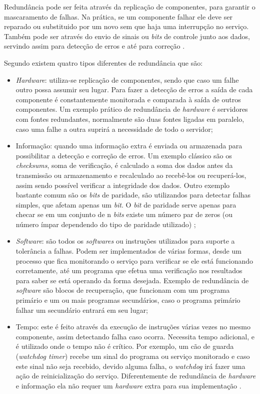 Redundância pode ser feita através da replicação de componentes, para garantir o mascaramento de falhas.
Na prática, se um componente falhar ele deve ser reparado ou substituido por um novo sem que haja uma interrupção no serviço.
Também pode ser através do envio de sinais ou \textit{bits} de controle junto aos dados, 
servindo assim para detecção de erros e até para correção \cite{weber2002}.

Segundo \cite{norvag2000} existem quatro tipos diferentes de redundância que são:
\begin{itemize}
 \item \textit{Hardware}: utiliza-se replicação de componentes, sendo que caso um falhe outro possa assumir seu lugar. 
 Para fazer a detecção de erros a saída de cada componente é constantemente monitorada e comparada à saída de outros componentes.
 Um exemplo prático de redundância de \textit{hardware} é servidores com fontes redundantes, normalmente são duas fontes ligadas em paralelo, 
 caso uma falhe a outra suprirá a necessidade de todo o servidor;
 \item Informação: quando uma informação extra é enviada ou armazenada para possibilitar a detecção e correção de erros.
 Um exemplo clássico são os \textit{checksums}, soma de verificação, é calculado a soma dos dados antes da transmissão ou armazenamento 
 e recalculado ao recebê-los ou recuperá-los, assim sendo possível verificar a integridade dos dados. Outro exemplo bastante comum são os 
 \textit{bits} de paridade, são utilizandos para detectar falhas simples, que afetam apenas um \textit{bit}. O \textit{bit} de paridade 
 serve apenas para checar se em um conjunto de n \textit{bits} existe um número par de zeros (ou número ímpar dependendo do tipo de paridade 
 utilizado) \cite{weber2002};
 \item \textit{Software}: são todos os \textit{softwares} ou instruções utilizados para suporte a tolerância a falhas. Podem ser implementados
 de várias formas, desde um processo que fica monitorando o serviço para verificar se ele está funcionando corretamente, até um programa
 que efetua uma verificação nos resultados para saber se está operando da forma desejada. Exemplo de redundância de \textit{software} são 
 blocos de recuperação, que funcionam com um programa primário e um ou mais programas secundários, caso o programa primário falhar um secundário
 entrará em seu lugar;
 \item Tempo: este é feito através da execução de instruções várias vezes no mesmo componente, assim detectando falha caso ocorra.
 Necessita tempo adicional, e é utilizado onde o tempo não é crítico. Por exemplo, um cão de guarda (\textit{watchdog timer})
 recebe um sinal do programa ou serviço monitorado e caso este sinal não seja recebido, devido alguma falha, o \textit{watchdog} irá fazer 
 uma ação de reinicialização do serviço.
 Diferentemente de redundância de \textit{hardware} e informação ela não requer um \textit{hardware} extra para sua implementação \cite{costa2009}.
\end{itemize}

